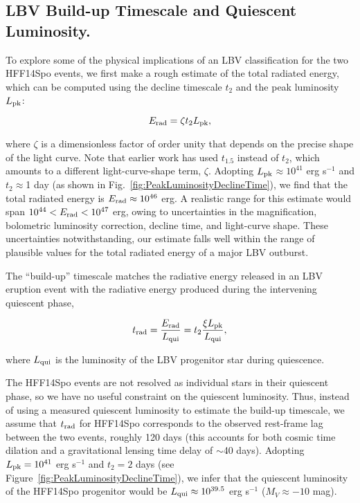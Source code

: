 \documentclass{article}
\providecommand\citep{\cite}
\def\spock{HFF14Spo\xspace}
\def\Lpk{\ensuremath{L_{\rm pk}}\xspace}
\def\t2{\ensuremath{t_{2}}\xspace}
\begin{document}
\subsection{LBV Build-up Timescale and Quiescent Luminosity.}\label{sec:LBVbuildup}

To explore some of the physical implications of an LBV classification
for the two \spock events, we first make a rough estimate of the total
radiated energy, which can be computed using the decline timescale
$t_2$ and the peak luminosity $L_{\rm pk}$:

\begin{equation}
  \label{eqn:Erad}
  E_{\rm rad} = \zeta \t2 \Lpk,
\end{equation}

\noindent where $\zeta$ is a dimensionless factor of order unity that
depends on the precise shape of the light
curve\cite{Smith:2011b}. Note that earlier work\cite{Smith:2011b} has
used $t_{1.5}$ instead of $t_2$, which amounts to a different
light-curve-shape term, $\zeta$.  Adopting \Lpk$\approx10^{41}$ erg
s$^{-1}$ and \t2$\approx$1 day (as shown in
Fig.~\ref{fig:PeakLuminosityDeclineTime}), we find that the total
radiated energy is $E_{\rm rad}\approx10^{46}$ erg.  A realistic range
for this estimate would span $10^{44}<E_{\rm rad}<10^{47}$ erg, owing to
uncertainties in the magnification, bolometric luminosity correction,
decline time, and light-curve shape. These uncertainties
notwithstanding, our estimate falls well within the range of plausible
values for the total radiated energy of a major LBV outburst.

The ``build-up'' timescale\citep{Smith:2011b} matches the radiative
energy released in an LBV eruption event with the radiative energy
produced during the intervening quiescent phase,

\begin{equation}
  \label{eqn:trad}
t_{\rm rad} = \frac{E_{\rm rad}}{L_{\rm qui}} = \t2 \frac{\xi\Lpk}{L_{\rm qui}},
\end{equation}

\noindent where $L_{\rm qui}$ is the luminosity of the LBV progenitor
star during quiescence.

The \spock events are not resolved as individual stars in their
quiescent phase, so we have no useful constraint on the quiescent
luminosity. Thus, instead of using a measured quiescent luminosity to
estimate the build-up timescale, we assume that $t_{\rm rad}$ for
\spock corresponds to the observed rest-frame lag between the two
events, roughly 120 days (this accounts for both cosmic time dilation
and a gravitational lensing time delay of $\sim$40 days). Adopting
$\Lpk=10^{41}$ erg s$^{-1}$ and $\t2=2$ days (see
Figure~\ref{fig:PeakLuminosityDeclineTime}), we infer that the
quiescent luminosity of the \spock progenitor would be
$L_{\rm qui}\approx10^{39.5}$ erg s$^{-1}$ ($M_V\approx-10$ mag).
\end{document}
